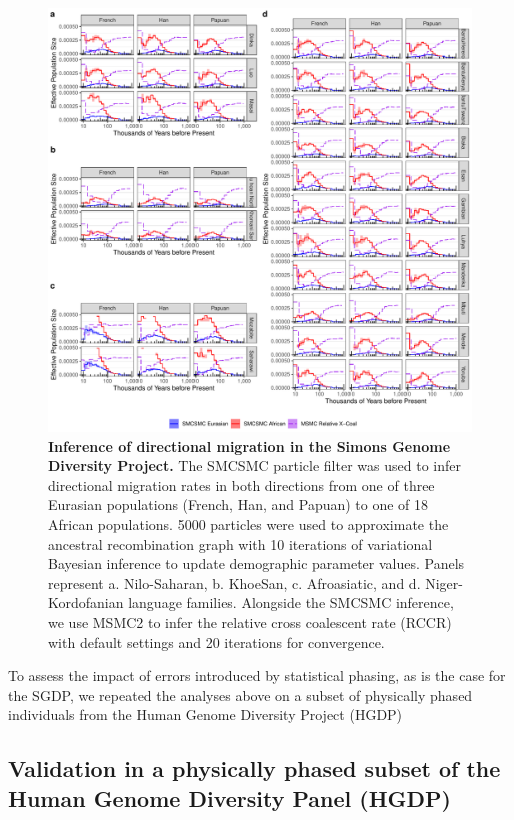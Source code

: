 \begin{figure}
	\centering
	\includegraphics[width=0.95\linewidth]{plot/sgdp_mig_new.pdf}
	\caption[Full directional migration inference results from SGDP]{{\bf Inference of directional migration in the Simons Genome Diversity Project.} The SMCSMC particle filter was used to infer directional migration rates in both directions from one of three Eurasian populations (French, Han, and Papuan) to one of 18 African populations. 5000 particles were used to approximate the ancestral recombination graph with 10 iterations of variational Bayesian inference to update demographic parameter values. Panels represent a. Nilo-Saharan, b. KhoeSan, c. Afroasiatic, and d. Niger-Kordofanian language families. Alongside the SMCSMC inference, we use MSMC2 to infer the relative cross coalescent rate (RCCR) with default settings and 20 iterations for convergence.}	
	\label{fig:sgdp_mig}
\end{figure}


To assess the impact of errors introduced by statistical phasing, as is the case for the SGDP, we repeated the analyses above on a subset of physically phased individuals from the Human Genome Diversity Project (HGDP) \cite{Mallick2016} 


\subsection{Validation in a physically phased subset of the Human Genome Diversity Panel (HGDP)} \label{hgdp_section}

